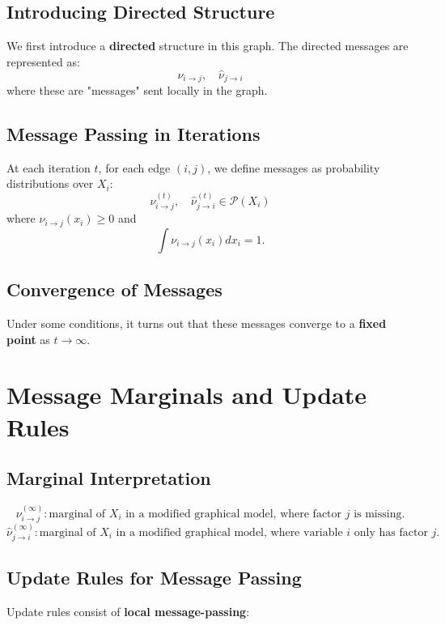 \documentclass{article}%
\begin{document}
\subsection*{Introducing Directed Structure}
We first introduce a \textbf{directed} structure in this graph. The directed messages are represented as:
\[
\nu_{i \to j}, \quad \hat{\nu}_{j \to i}
\]
where these are "messages" sent locally in the graph.

\subsection*{Message Passing in Iterations}
At each iteration \( t \), for each edge \( (i,j) \), we define messages as probability distributions over \( X_i \):
\[
\nu_{i \to j}^{(t)}, \quad \hat{\nu}_{j \to i}^{(t)} \in \mathcal{P}(X_i)
\]
where \( \nu_{i \to j}(x_i) \geq 0 \) and 
\[
\int \nu_{i \to j}(x_i) dx_i = 1.
\]

\subsection*{Convergence of Messages}
Under some conditions, it turns out that these messages converge to a \textbf{fixed point} as \( t \to \infty \).




\section*{Message Marginals and Update Rules}

\subsection*{Marginal Interpretation}
\[
\nu_{i \to j}^{(\infty)} : \text{marginal of } X_i \text{ in a modified graphical model, where factor } j \text{ is missing.}
\]
\[
\hat{\nu}_{j \to i}^{(\infty)} : \text{marginal of } X_i \text{ in a modified graphical model, where variable } i \text{ only has factor } j.
\]

\subsection*{Update Rules for Message Passing}
Update rules consist of \textbf{local message-passing}:

\end{document}
